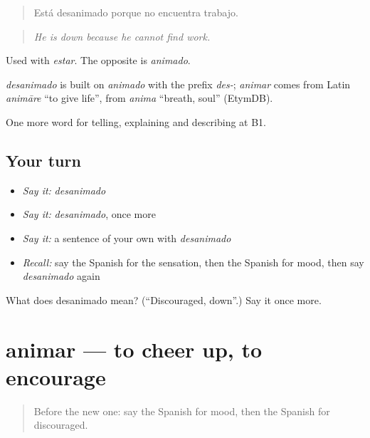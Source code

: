 \begin{quote}
Está desanimado porque no encuentra trabajo.
\end{quote}

\begin{quote}
\emph{He is down because he cannot find work.}
\end{quote}

Used with \emph{estar}. The opposite is \emph{animado}.

\begin{cousinweb}
\emph{desanimado} is built on \emph{animado} with the prefix \emph{des-}; \emph{animar} comes from Latin \emph{animāre} \textquotedblleft{}to give life\textquotedblright{}, from \emph{anima} \textquotedblleft{}breath, soul\textquotedblright{} (EtymDB).
\end{cousinweb}

\begin{grammarlens}[title={What you've built}]
One more word for telling, explaining and describing at B1.
\end{grammarlens}

\subsection*{Your turn}
\begin{itemize}
\raggedright
  \item \emph{Say it:} \emph{desanimado}
  \item \emph{Say it:} \emph{desanimado}, once more
  \item \emph{Say it:} a sentence of your own with \emph{desanimado}
  \item \emph{Recall:} say the Spanish for the sensation, then the Spanish for mood, then say \emph{desanimado} again
\end{itemize}

\begin{tcolorbox}[breakable,colback=teal!4,colframe=teal!35!black,title={Before you move on}]
What does desanimado mean? (\textquotedblleft{}Discouraged, down\textquotedblright{}.) Say it once more.
\end{tcolorbox}
\section[animar]{animar — to cheer up, to encourage}

\label{lesson:ES-C712-animar}



\begin{quote}
Before the new one: say the Spanish for mood, then the Spanish for discouraged.
\end{quote}

